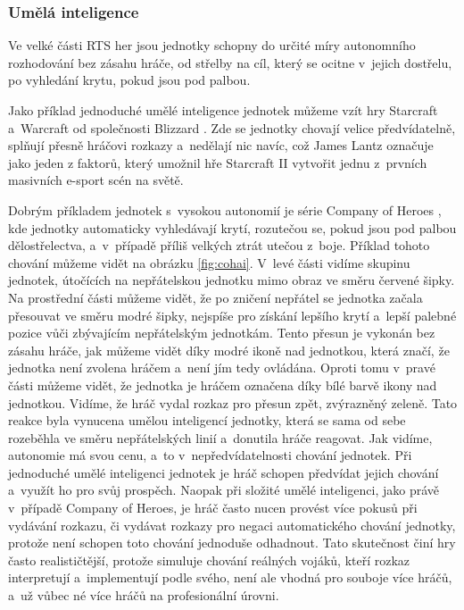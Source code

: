 \subsubsection{Umělá inteligence}

Ve velké části RTS her jsou jednotky schopny do určité míry autonomního rozhodování bez zásahu hráče, od střelby na cíl, který se ocitne v~jejich dostřelu, po vyhledání krytu, pokud jsou pod palbou. 

Jako příklad jednoduché umělé inteligence jednotek můžeme vzít hry Starcraft \citep{site:starcraft} a~Warcraft \citep{site:warcraft3} od společnosti Blizzard \citep{site:blizz}. Zde se jednotky chovají velice předvídatelně, splňují přesně hráčovi rozkazy a~nedělají nic navíc, což James Lantz \citep{site:gamasutra01} označuje jako jeden z faktorů, který umožnil hře Starcraft II vytvořit jednu z~prvních masivních e-sport scén na světě.



Dobrým příkladem jednotek s~vysokou autonomií je série Company of Heroes \citep{site:COH}, kde jednotky automaticky vyhledávají krytí, rozutečou se, pokud jsou pod palbou dělostřelectva, a~v~případě příliš velkých ztrát utečou z~boje. Příklad tohoto chování můžeme vidět na obrázku \ref{fig:cohai}. V~levé části vidíme skupinu jednotek, útočících na nepřátelskou jednotku mimo obraz ve směru červené šipky. Na prostřední části můžeme vidět, že po zničení nepřátel se jednotka začala přesouvat ve směru modré šipky, nejspíše pro získání lepšího krytí a~lepší palebné pozice vůči zbývajícím nepřátelským jednotkám. Tento přesun je vykonán bez zásahu hráče, jak můžeme vidět díky modré ikoně nad jednotkou, která značí, že jednotka není zvolena hráčem a~není jím tedy ovládána. Oproti tomu v~pravé části můžeme vidět, že jednotka je hráčem označena díky bílé barvě ikony nad jednotkou. Vidíme, že hráč vydal rozkaz pro přesun zpět, zvýrazněný zeleně. Tato reakce byla vynucena umělou inteligencí jednotky, která se sama od sebe rozeběhla ve směru nepřátelských linií a~donutila hráče reagovat. Jak vidíme, autonomie má svou cenu, a~to v~nepředvídatelnosti chování jednotek. Při jednoduché umělé inteligenci jednotek je hráč schopen předvídat jejich chování a~využít ho pro svůj prospěch. Naopak při složité umělé inteligenci, jako právě v~případě Company of Heroes, je hráč často nucen provést více pokusů při vydávání rozkazu, či vydávat rozkazy pro negaci automatického chování jednotky, protože není schopen toto chování jednoduše odhadnout. Tato skutečnost činí hry často realističtější, protože simuluje chování reálných vojáků, kteří rozkaz interpretují a~implementují podle svého, není ale vhodná pro souboje více hráčů, a~už vůbec né více hráčů na profesionální úrovni.

